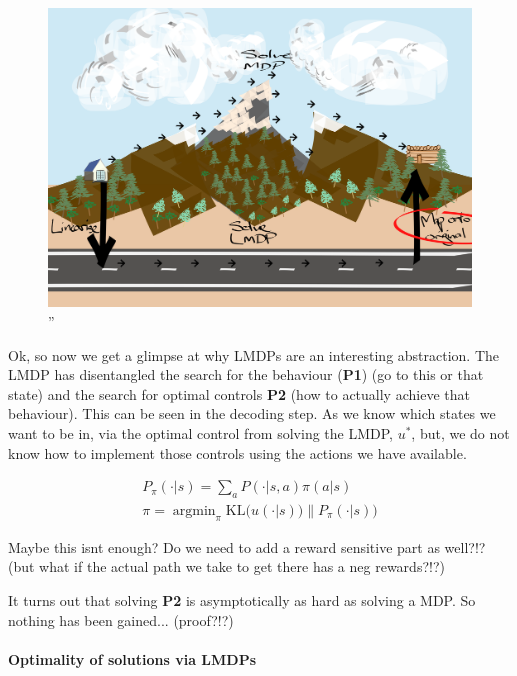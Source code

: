 \begin{figure}
\centering
\includegraphics[width=1\textwidth,height=0.5\textheight]{../../pictures/drawings/abstract-representations-project.png}
\caption{''}
\end{figure}

Ok, so now we get a glimpse at why LMDPs are an interesting abstraction.
The LMDP has disentangled the search for the behaviour (\textbf{P1}) (go to this or
that state) and the search for optimal controls \textbf{P2} (how to actually achieve
that behaviour). This can be seen in the decoding step. As we know which
states we want to be in, via the optimal control from solving the LMDP,
\(u^{* }\), but, we do not know how to implement those controls using
the actions we have available.

\begin{align}
P_{\pi}(\cdot | s) = \sum_a P(\cdot | s, a) \pi(a | s) \\
\pi = \mathop{\text{argmin}}_{\pi} \text{KL}\Big(u(\cdot | s))\parallel P_{\pi}(\cdot | s)\Big)
\end{align}

Maybe this isnt enough? Do we need to add a reward sensitive part as
well?!? (but what if the actual path we take to get there has a neg
rewards?!?)

It turns out that solving \textbf{P2} is asymptotically as hard as solving a MDP.
So nothing has been gained... (proof?!?)

\hypertarget{optimality-of-solutions-via-lmdps}{%
\paragraph{Optimality of solutions via
LMDPs}\label{optimality-of-solutions-via-lmdps}}

